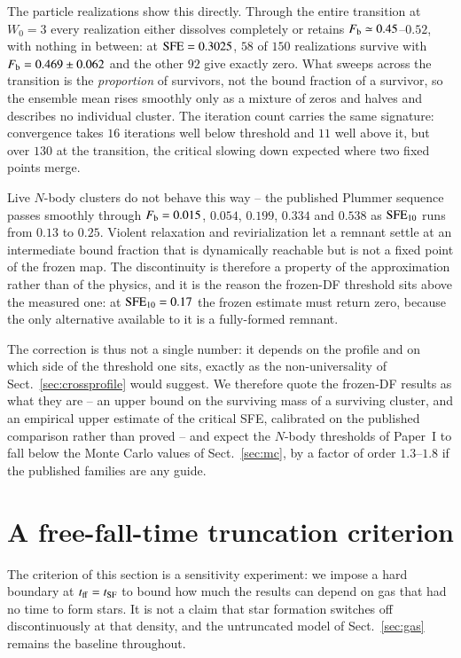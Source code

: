 \documentclass{aa}
\newcommand{\sfe}{{\rm SFE}}
\newcommand{\tsf}{t_{\rm SF}}
\newcommand{\tff}{t_{\rm ff}}
\begin{document}
The particle realizations show this directly. Through the entire
transition at $W_0=3$ every realization either dissolves completely or
retains $F_{\rm b}\simeq0.45$--$0.52$, with nothing in between: at
$\sfe=0.3025$, $58$ of $150$ realizations survive with
$F_{\rm b}=0.469\pm0.062$ and the other $92$ give exactly zero. What
sweeps across the transition is the \emph{proportion} of survivors, not
the bound fraction of a survivor, so the ensemble mean rises smoothly
only as a mixture of zeros and halves and describes no individual
cluster. The iteration count carries the same signature: convergence
takes $16$ iterations well below threshold and $11$ well above it, but
over $130$ at the transition, the critical slowing down expected where
two fixed points merge.

Live $N$-body clusters do not behave this way -- the published Plummer
sequence passes smoothly through $F_{\rm b}=0.015$, $0.054$, $0.199$,
$0.334$ and $0.538$ as $\sfe_{10}$ runs from $0.13$ to $0.25$. Violent
relaxation and revirialization let a remnant settle at an intermediate
bound fraction that is dynamically reachable but is not a fixed point of
the frozen map. The discontinuity is therefore a property of the
approximation rather than of the physics, and it is the reason the
frozen-DF threshold sits above the measured one: at $\sfe_{10}=0.17$ the
frozen estimate must return zero, because the only alternative available
to it is a fully-formed remnant.

The correction is thus not a single number: it depends on the profile
and on which side of the threshold one sits, exactly as the
non-universality of Sect.~\ref{sec:crossprofile} would suggest. We
therefore quote the frozen-DF results as what they are -- an upper bound
on the surviving mass of a surviving cluster, and an empirical upper
estimate of the critical SFE, calibrated on the published comparison
rather than proved -- and expect the $N$-body thresholds of Paper~I to
fall below the Monte Carlo values of Sect.~\ref{sec:mc}, by a factor of
order $1.3$--$1.8$ if the published families are any guide.

\section{A free-fall-time truncation criterion}
\label{sec:truncation}

The criterion of this section is a sensitivity experiment: we impose a
hard boundary at $\tff=\tsf$ to bound how much the results can depend on
gas that had no time to form stars. It is not a claim that star
formation switches off discontinuously at that density, and the
untruncated model of Sect.~\ref{sec:gas} remains the baseline
throughout.
\end{document}
